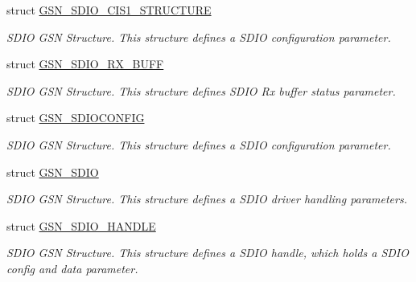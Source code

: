 \begin{DoxyCompactItemize}
struct \hyperlink{a00218}{GSN\_\-SDIO\_\-CIS1\_\-STRUCTURE}
\begin{DoxyCompactList}\small\item\em SDIO GSN Structure. This structure defines a SDIO configuration parameter. \end{DoxyCompactList}\item 
struct \hyperlink{a00225}{GSN\_\-SDIO\_\-RX\_\-BUFF}
\begin{DoxyCompactList}\small\item\em SDIO GSN Structure. This structure defines SDIO Rx buffer status parameter. \end{DoxyCompactList}\item 
struct \hyperlink{a00226}{GSN\_\-SDIOCONFIG}
\begin{DoxyCompactList}\small\item\em SDIO GSN Structure. This structure defines a SDIO configuration parameter. \end{DoxyCompactList}\item 
struct \hyperlink{a00216}{GSN\_\-SDIO}
\begin{DoxyCompactList}\small\item\em SDIO GSN Structure. This structure defines a SDIO driver handling parameters. \end{DoxyCompactList}\item 
struct \hyperlink{a00224}{GSN\_\-SDIO\_\-HANDLE}
\begin{DoxyCompactList}\small\item\em SDIO GSN Structure. This structure defines a SDIO handle, which holds a SDIO config and data parameter. \end{DoxyCompactList}\end{DoxyCompactItemize}
